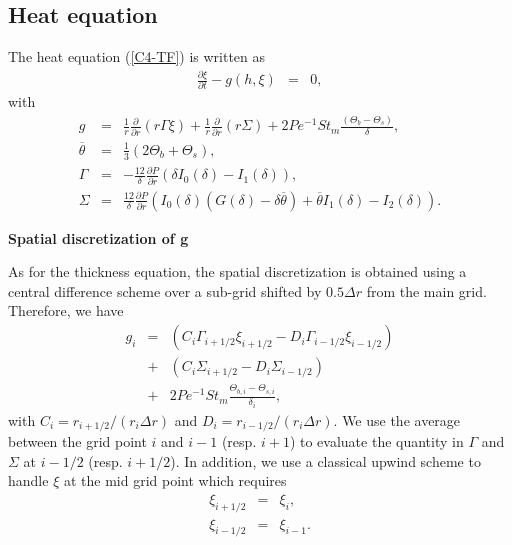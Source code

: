 \subsection{Heat equation}

The heat equation (\ref{C4-TF}) is written as
\begin{eqnarray}
  \frac{\partial \xi}{\partial t}-g(h,\xi)&=&0,
\end{eqnarray}
with
\begin{eqnarray}
  g& =& \frac{1}{r}\frac{\partial}{\partial                          r}
        \left( r\Gamma\xi\right) +\frac{1}{r}\frac{\partial}{\partial                          r}
        \left(r\Sigma\right)+2Pe^{-1}St_m\frac{\left(\Theta_b-\Theta_s\right)}{\delta},\\
  \overline{\theta}&=&\frac{1}{3}\left(2\Theta_b+\Theta_s\right),\\
  \Gamma&=&-\frac{12}{\delta}
            \frac{\partial
            P}{\partial
            r}\left(\delta
            I_0(\delta)-I_1(\delta)\right),\\
  \Sigma &=& \frac{12}{\delta} \frac{\partial P}{\partial r}\left(I_0(\delta)\left(G(\delta)-\delta\overline{\theta}\right)+\overline{\theta}I_1(\delta)-I_2(\delta)\right).
\end{eqnarray}

\vspace{.5cm} \textbf{Spatial discretization of g} \vspace{.5cm}

As for the thickness equation,  the spatial discretization is obtained
using  a  central  difference  scheme   over  a  sub-grid  shifted  by
$0.5\Delta r$ from the main grid. Therefore, we have
\begin{eqnarray}
  g_i &=& \left(C_i\Gamma_{i+1/2}\xi_{i+1/2}-D_i\Gamma_{i-1/2}\xi_{i-1/2}\right)\\
      &+&\left(C_i\Sigma_{i+1/2}-D_i\Sigma_{i-1/2}\right)\\
      &+&2Pe^{-1}St_m\frac{\Theta_{b,i}-\Theta_{s,i}}{\delta_i},
\end{eqnarray}
with         $C_i         =r_{i+1/2}/(r_i\Delta        r)$         and
$D_i =r_{i-1/2}/(r_i\Delta r)$.   We use the average  between the grid
point $i$ and $i-1$ (resp. $i+1$) to evaluate the quantity in $\Gamma$
and  $\Sigma$ at  $i-1/2$ (resp.   $i+1/2$).   In addition,  we use  a
classical upwind  scheme to handle $\xi$  at the mid grid  point which
requires
\begin{eqnarray}
  \xi_{i+1/2} &=& \xi_i,\\
  \xi_{i-1/2} &=& \xi_{i-1}.
\end{eqnarray}

